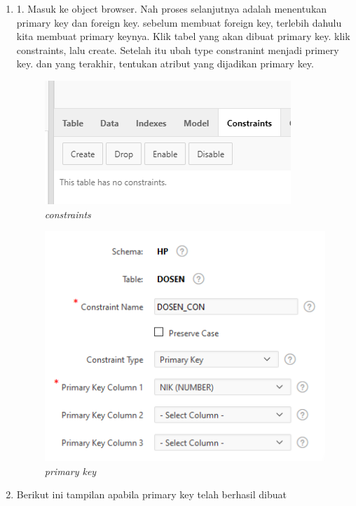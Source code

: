 \begin{enumerate}
    \item 1.	Masuk ke object browser. Nah proses selanjutnya adalah menentukan primary key dan foreign key. sebelum membuat foreign key, terlebih dahulu kita membuat primary keynya. Klik tabel yang akan dibuat primary key. klik constraints, lalu create. Setelah itu ubah type constranint menjadi primery key. dan yang terakhir, tentukan atribut yang dijadikan primary key.
    
    \begin{figure}[!htbp]
        \centering
        \includegraphics[scale=0.7]{figure/constraints.PNG}
        \caption{\textit{constraints}}
        \label{fig:my_label}
    \end{figure}
    
    \begin{figure}[!htbp]
        \centering
        \includegraphics[scale=0.7]{figure/primary_key.PNG}
        \caption{\textit{primary key}}
        \label{fig:my_label}
    \end{figure}
    
    \newpage
    \item Berikut ini tampilan apabila primary key telah berhasil dibuat
    

\end{enumerate}
